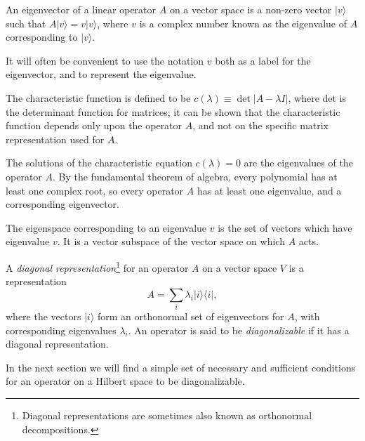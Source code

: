 
\begin{definition}
    An eigenvector of a linear operator $A$ on a vector space is a non-zero vector $|v\rangle$ such that $A|v\rangle=v|v\rangle$, where $v$ is a complex number known as the eigenvalue of $A$ corresponding to $|v\rangle$. 
\end{definition}

\begin{remark}
    It will often be convenient to use the notation $v$ both as a label for the eigenvector, and to represent the eigenvalue. 
\end{remark}


The characteristic function is defined to be $c(\lambda) \equiv \operatorname{det}|A-\lambda I|$, where det is the determinant function for matrices; it can be shown that the characteristic function depends only upon the operator $A$, and not on the specific matrix representation used for $A$. 

The solutions of the characteristic equation $c(\lambda)=0$ are the eigenvalues of the operator $A$. By the fundamental theorem of algebra, every polynomial has at least one complex root, so every operator $A$ has at least one eigenvalue, and a corresponding eigenvector. 

The eigenspace corresponding to an eigenvalue $v$ is the set of vectors which have eigenvalue $v$. It is a vector subspace of the vector space on which $A$ acts.

\begin{definition}
    A \textit{diagonal representation}\footnote{Diagonal representations are sometimes also known as orthonormal decompositions.} for an operator $A$ on a vector space $V$ is a representation 
    \begin{equation}
    A=\sum_{i} \lambda_{i}|i\rangle\langle i|,
\end{equation}
where the vectors $|i\rangle$ form an orthonormal set of eigenvectors for $A$, with corresponding eigenvalues $\lambda_{i}$. An operator is said to be \textit{diagonalizable} if it has a diagonal representation. 
\end{definition}

In the next section we will find a simple set of necessary and sufficient conditions for an operator on a Hilbert space to be diagonalizable. 

